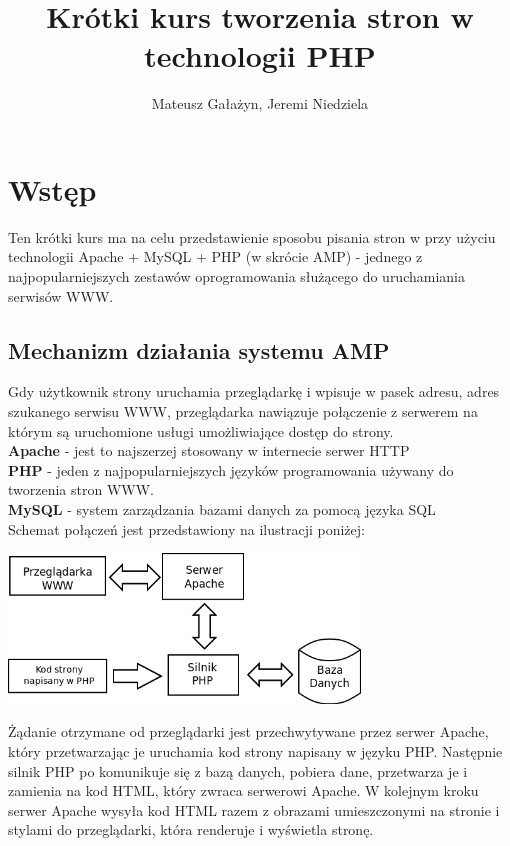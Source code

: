 \documentclass[a4paper,10pt]{article}
\author{Mateusz Gałażyn, Jeremi Niedziela}
\title{Krótki kurs tworzenia stron w technologii PHP}
\begin{document}
\pagestyle{fancy}


\maketitle
\section{Wstęp}
Ten krótki kurs ma na celu przedstawienie sposobu pisania stron w przy użyciu technologii Apache + MySQL + PHP (w skrócie AMP) - jednego z najpopularniejszych zestawów oprogramowania służącego do uruchamiania serwisów WWW. 
\subsection{Mechanizm działania systemu AMP} 
Gdy użytkownik strony uruchamia przeglądarkę i wpisuje w pasek adresu, adres szukanego serwisu WWW, przeglądarka nawiązuje połączenie z serwerem na którym są uruchomione usługi umożliwiające dostęp do strony. \\
\textbf{Apache} - jest to najszerzej stosowany w internecie serwer HTTP \\
\textbf{PHP} - jeden z najpopularniejszych języków programowania używany do tworzenia stron WWW. \\
\textbf{MySQL} - system zarządzania bazami danych za pomocą języka SQL \\
Schemat połączeń jest przedstawiony na ilustracji poniżej:

\begin{center}
\includegraphics[width=0.7\textwidth]{LAMP.png} 
\end{center}

Żądanie otrzymane od przeglądarki jest przechwytywane przez serwer Apache, który przetwarzając je uruchamia kod strony napisany w języku PHP. Następnie silnik PHP po komunikuje się z bazą danych, pobiera dane, przetwarza je i zamienia na kod HTML, który zwraca serwerowi Apache. W kolejnym kroku serwer Apache wysyła kod HTML razem z obrazami umieszczonymi na stronie i stylami do przeglądarki, która renderuje i wyświetla stronę.
\end{document}
